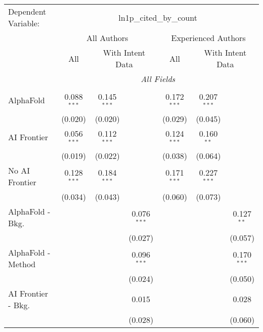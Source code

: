 \begingroup
\centering
\begin{tabular}{lcccccc}
   \tabularnewline \midrule \midrule
   Dependent Variable: & \multicolumn{6}{c}{ln1p\_cited\_by\_count}\\
 & \multicolumn{3}{c}{All Authors} & \multicolumn{3}{c}{Experienced Authors} \\
\cmidrule(lr){2-4} \cmidrule(lr){5-7}
 & \multicolumn{1}{c}{All} & \multicolumn{2}{c}{With Intent Data} & \multicolumn{1}{c}{All} & \multicolumn{2}{c}{With Intent Data} \\
\cmidrule(lr){2-2} \cmidrule(lr){3-4} \cmidrule(lr){5-5} \cmidrule(lr){6-7}
 & \multicolumn{6}{c}{\textit{All Fields}} \\ \\
   AlphaFold               & 0.088$^{***}$ & 0.145$^{***}$ &               & 0.172$^{***}$ & 0.207$^{***}$ &   \\   
                           & (0.020)       & (0.020)       &               & (0.029)       & (0.045)       &   \\   
   AI Frontier             & 0.056$^{***}$ & 0.112$^{***}$ &               & 0.124$^{***}$ & 0.160$^{**}$  &   \\   
                           & (0.019)       & (0.022)       &               & (0.038)       & (0.064)       &   \\   
   No AI Frontier          & 0.128$^{***}$ & 0.184$^{***}$ &               & 0.171$^{***}$ & 0.227$^{***}$ &   \\   
                           & (0.034)       & (0.043)       &               & (0.060)       & (0.073)       &   \\   
   AlphaFold - Bkg.        &               &               & 0.076$^{***}$ &               &               & 0.127$^{**}$\\   
                           &               &               & (0.027)       &               &               & (0.057)\\   
   AlphaFold - Method      &               &               & 0.096$^{***}$ &               &               & 0.170$^{***}$\\   
                           &               &               & (0.024)       &               &               & (0.050)\\   
   AI Frontier - Bkg.      &               &               & 0.015         &               &               & 0.028\\   
                           &               &               & (0.028)       &               &               & (0.060)\\   

\end{tabular}
